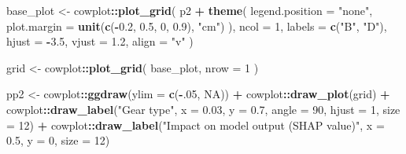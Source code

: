 \documentclass[
]{book}
\newenvironment{Shaded}{\begin{snugshade}}{\end{snugshade}}
\newcommand{\AttributeTok}[1]{\textcolor[rgb]{0.13,0.29,0.53}{#1}}
\newcommand{\ConstantTok}[1]{\textcolor[rgb]{0.56,0.35,0.01}{#1}}
\newcommand{\DecValTok}[1]{\textcolor[rgb]{0.00,0.00,0.81}{#1}}
\newcommand{\FloatTok}[1]{\textcolor[rgb]{0.00,0.00,0.81}{#1}}
\newcommand{\FunctionTok}[1]{\textcolor[rgb]{0.13,0.29,0.53}{\textbf{#1}}}
\newcommand{\NormalTok}[1]{#1}
\newcommand{\OtherTok}[1]{\textcolor[rgb]{0.56,0.35,0.01}{#1}}
\newcommand{\SpecialCharTok}[1]{\textcolor[rgb]{0.81,0.36,0.00}{\textbf{#1}}}
\newcommand{\StringTok}[1]{\textcolor[rgb]{0.31,0.60,0.02}{#1}}
\begin{document}
\begin{Shaded}
\begin{Highlighting}[]
\NormalTok{base\_plot }\OtherTok{\textless{}{-}}
\NormalTok{  cowplot}\SpecialCharTok{::}\FunctionTok{plot\_grid}\NormalTok{(}
\NormalTok{    p2 }\SpecialCharTok{+} \FunctionTok{theme}\NormalTok{(}
      \AttributeTok{legend.position =} \StringTok{"none"}\NormalTok{,}
      \AttributeTok{plot.margin =} \FunctionTok{unit}\NormalTok{(}\FunctionTok{c}\NormalTok{(}\SpecialCharTok{{-}}\FloatTok{0.2}\NormalTok{, }\FloatTok{0.5}\NormalTok{, }\DecValTok{0}\NormalTok{, }\FloatTok{0.9}\NormalTok{), }\StringTok{"cm"}\NormalTok{)}
\NormalTok{    ),}
    \AttributeTok{ncol =} \DecValTok{1}\NormalTok{,}
    \AttributeTok{labels =} \FunctionTok{c}\NormalTok{(}\StringTok{"B"}\NormalTok{, }\StringTok{"D"}\NormalTok{),}
    \AttributeTok{hjust =} \SpecialCharTok{{-}}\FloatTok{3.5}\NormalTok{,}
    \AttributeTok{vjust =} \FloatTok{1.2}\NormalTok{,}
    \AttributeTok{align =} \StringTok{"v"}
\NormalTok{  )}

\NormalTok{grid }\OtherTok{\textless{}{-}}
\NormalTok{  cowplot}\SpecialCharTok{::}\FunctionTok{plot\_grid}\NormalTok{(}
\NormalTok{    base\_plot,}
    \AttributeTok{nrow =} \DecValTok{1}
\NormalTok{  )}

\NormalTok{pp2 }\OtherTok{\textless{}{-}}
\NormalTok{  cowplot}\SpecialCharTok{::}\FunctionTok{ggdraw}\NormalTok{(}\AttributeTok{ylim =} \FunctionTok{c}\NormalTok{(}\SpecialCharTok{{-}}\NormalTok{.}\DecValTok{05}\NormalTok{, }\ConstantTok{NA}\NormalTok{)) }\SpecialCharTok{+}
\NormalTok{  cowplot}\SpecialCharTok{::}\FunctionTok{draw\_plot}\NormalTok{(grid) }\SpecialCharTok{+}
\NormalTok{  cowplot}\SpecialCharTok{::}\FunctionTok{draw\_label}\NormalTok{(}\StringTok{"Gear type"}\NormalTok{, }\AttributeTok{x =} \FloatTok{0.03}\NormalTok{, }\AttributeTok{y =} \FloatTok{0.7}\NormalTok{, }\AttributeTok{angle =} \DecValTok{90}\NormalTok{, }\AttributeTok{hjust =} \DecValTok{1}\NormalTok{, }\AttributeTok{size =} \DecValTok{12}\NormalTok{) }\SpecialCharTok{+}
\NormalTok{  cowplot}\SpecialCharTok{::}\FunctionTok{draw\_label}\NormalTok{(}\StringTok{"Impact on model output (SHAP value)"}\NormalTok{, }\AttributeTok{x =} \FloatTok{0.5}\NormalTok{, }\AttributeTok{y =} \DecValTok{0}\NormalTok{, }\AttributeTok{size =} \DecValTok{12}\NormalTok{)}


\end{Highlighting}
\end{Shaded}
\end{document}
